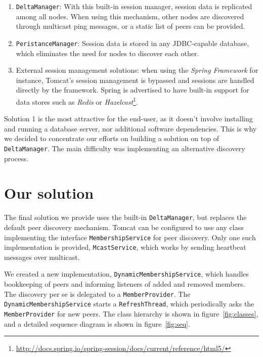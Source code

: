 \documentclass[11pt,a4paper]{article}
\begin{document}
\begin{enumerate}
\item \texttt{DeltaManager}: With this built-in session manager, session data is replicated among all nodes. When using this mechanism, other nodes are discovered through multicast ping messages, or a static list of peers can be provided.

\item \texttt{PeristanceManager}: Session data is stored in any JDBC-capable database, which eliminates the need for nodes to discover each other.

\item External session management solutions: when using the \emph{Spring Framework}\autocite{spring} for instance, Tomcat's session management is bypassed and sessions are handled directly by the framework. Spring is advertised to have built-in support for data stores such as  \emph{Redis} or \emph{Hazelcast}\footnote{\url{http://docs.spring.io/spring-session/docs/current/reference/html5/}}.
\end{enumerate}

Solution 1 is the most attractive for the end-user, as it doesn't involve installing and running a database server, nor additional software dependencies. This is why we decided to concentrate our efforts on building a solution on top of \texttt{DeltaManager}. The main difficulty was implementing an alternative discovery process.

\section{Our solution}

The final solution we provide uses the built-in \texttt{DeltaManager}, but replaces the default peer discovery mechanism. Tomcat can be configured to use any class implementing the interface \texttt{MembershipService} for peer discovery. Only one such implementation is provided, \texttt{McastService}, which works by sending heartbeat messages over multicast.

We created a new implementation, \texttt{DynamicMembershipService}, which handles bookkeeping of peers and informing listeners of added and removed members. The discovery per se is delegated to a \texttt{MemberProvider}. The \texttt{DynamicMembershipService} starts a \texttt{RefreshThread}, which periodically asks the \texttt{MemberProvider} for new peers. The class hierarchy is shown in figure~\ref{fig:classes}, and a detailed sequence diagram is shown in figure~\ref{fig:seq}.
\end{document}
